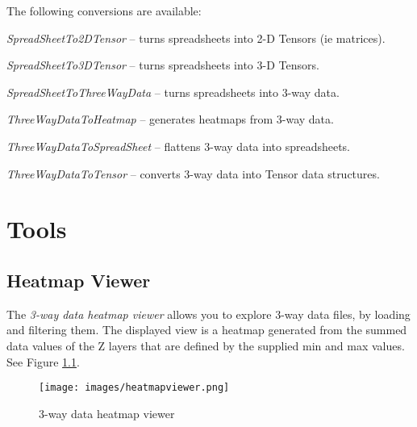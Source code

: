 \documentclass[a4paper]{book}
\begin{document}
\noindent The following conversions are available:
\begin{tight_itemize}
  \item \textit{SpreadSheetTo2DTensor} -- turns spreadsheets into 2-D Tensors (ie matrices).
  \item \textit{SpreadSheetTo3DTensor} -- turns spreadsheets into 3-D Tensors.
  \item \textit{SpreadSheetToThreeWayData} -- turns spreadsheets into 3-way data.
  \item \textit{ThreeWayDataToHeatmap} -- generates heatmaps from 3-way data.
  \item \textit{ThreeWayDataToSpreadSheet} -- flattens 3-way data into spreadsheets.
  \item \textit{ThreeWayDataToTensor} -- converts 3-way data into Tensor data structures.
\end{tight_itemize}

\chapter{Tools}
\section{Heatmap Viewer}
The \textit{3-way data heatmap viewer} allows you to explore 3-way data files,
by loading and filtering them. The displayed view is a heatmap generated from
the summed data values of the Z layers that are defined by the supplied min
and max values. See Figure \ref{heatmapviewer}.

\begin{figure}[htb]
  \centering
  \texttt{[image: images/heatmapviewer.png]}
  \caption{3-way data heatmap viewer}
  \label{heatmapviewer}
\end{figure}


\end{document}
